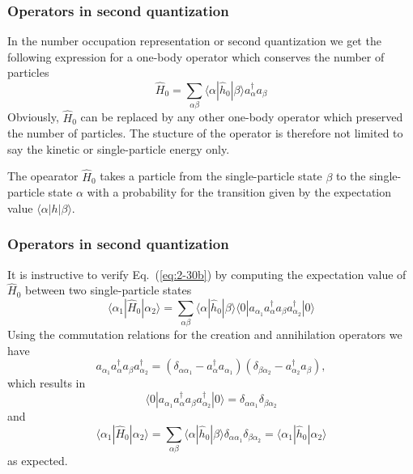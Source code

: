 \documentclass[compress]{beamer}
\newcommand*{\ket}[1]{|#1\rangle}
\newcommand*{\bra}[1]{\langle#1|}
\newcommand{\element}[3]
        {\bra{#1}#2\ket{#3}}
\begin{document}
\frame
{
  \frametitle{Operators in second quantization}
\begin{small}
{\scriptsize
In the number occupation representation or second quantization we get the following expression for a one-body 
operator which conserves the number of particles
\begin{equation}
	\hat{H}_0 = \sum_{\alpha\beta} \element{\alpha}{\hat{h}_0}{\beta} a_\alpha^\dagger a_\beta \label{eq:2-30b}
\end{equation}
Obviously, $\hat{H}_0$ can be replaced by any other one-body  operator which preserved the number
of particles. The stucture of the operator is therefore not limited to say the kinetic or single-particle energy only.

The opearator $\hat{H}_0$ takes a particle from the single-particle state $\beta$  to the single-particle state $\alpha$ 
with a probability for the transition given by the expectation value $\element{\alpha}{h}{\beta}$.
}
\end{small}
}

\frame
{
  \frametitle{Operators in second quantization}
\begin{small}
{\scriptsize
It is instructive to verify Eq.~(\ref{eq:2-30b}) by computing the expectation value of $\hat{H}_0$ 
between two single-particle states
\begin{equation}
	\element{\alpha_1}{\hat{H}_0}{\alpha_2} = \sum_{\alpha\beta} \element{\alpha}{\hat{h}_0}{\beta} 
		\element{0}{a_{\alpha_1}a_\alpha^\dagger a_\beta a_{\alpha_2}^\dagger}{0} \label{eq:2-30c}
\end{equation}
Using the commutation relations for the creation and annihilation operators we have 
\begin{equation}
	a_{\alpha_1}a_\alpha^\dagger a_\beta a_{\alpha_2}^\dagger = (\delta_{\alpha \alpha_1} - a_\alpha^\dagger a_{\alpha_1} )
		(\delta_{\beta \alpha_2} - a_{\alpha_2}^\dagger a_{\beta} ), \label{eq:2-30d}
\end{equation}
which results in
\begin{equation}
	\element{0}{a_{\alpha_1}a_\alpha^\dagger a_\beta a_{\alpha_2}^\dagger}{0} = 
		\delta_{\alpha \alpha_1} \delta_{\beta \alpha_2} \label{eq:2-30e}
\end{equation}
and
\begin{equation}
	\element{\alpha_1}{\hat{H}_0}{\alpha_2} = \sum_{\alpha\beta} \element{\alpha}{\hat{h}_0}{\beta} 
		\delta_{\alpha \alpha_1} \delta_{\beta \alpha_2} = \element{\alpha_1}{\hat{h}_0}{\alpha_2} \label{eq:2-30f}
\end{equation}
as expected.
}
\end{small}
}
\end{document}
